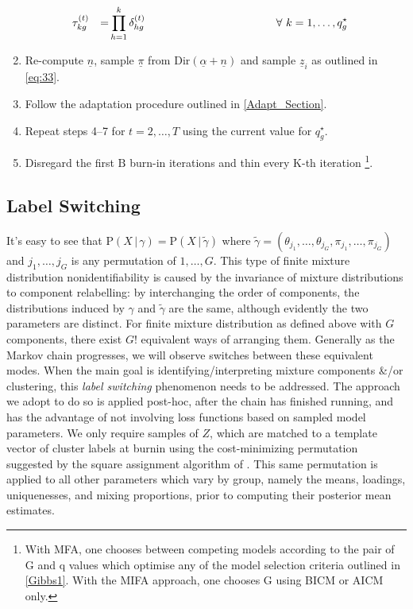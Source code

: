 \documentclass[a4paper,12pt,fleqn]{article}
\numberwithin{equation}{section}
\def\given{\,|\,}
\begin{document}
\begin{enumerate}[label*=\arabic*.]
\begin{alignat*}{4}
		&\tau_{kg}^{\left(t\right)} &=& \prod_{h=1}^{k}\delta_{hg}^{\left(t\right)}\quad\hspace{38mm}\forall~k=1,\ldots,q_g^\star\nonumber
		\end{alignat*}
	\item Re-compute $\underline{n}$, sample $\underline{\pi}$ from $\textrm{Dir}\left(\underline{\alpha} + \underline{n}\right)$ and sample $\underline{z}_i$ as outlined in \eqref{eq:33}.
	\item Follow the adaptation procedure outlined in \ref{Adapt_Section}.
	\item Repeat steps 4--7 for $t=2,\ldots,T$ using the current value for $q_g^\star$.
	\item Disregard the first $\textrm{B}$ burn-in iterations and thin every $\textrm{K}$-th iteration \footnote{With MFA, one chooses between competing models according to the pair of G and q values which optimise any of the model selection criteria outlined in \ref{Gibbs1}. With the MIFA approach, one chooses G using BICM or AICM only.}.
\end{enumerate}
\subsection[Label Switching]{Label Switching}
It's easy to see that $\mathrm{P}\left(X\given\gamma\right) = \mathrm{P}\left(X\given\tilde\gamma\right)$ where $\tilde\gamma = \left(\theta_{j_1},\ldots,\theta_{j_G},\pi_{j_1},\ldots,\pi_{j_G}\right)$ and $j_1,\ldots,j_G$ is any permutation of $1,\ldots,G$. This type of finite mixture distribution nonidentifiability is caused by the invariance of mixture distributions to component relabelling: by interchanging the order of components, the distributions induced by $\gamma$ and $\tilde{\gamma}$ are the same, although evidently the two parameters are distinct. For finite mixture distribution as defined above with $G$ components, there exist $G!$ equivalent ways of arranging them. Generally as the Markov chain progresses, we will observe switches between these equivalent modes. When the main goal is identifying/interpreting mixture components \&/or clustering, this \textit{label switching} phenomenon needs to be addressed. The approach we adopt to do so is applied post-hoc, after the chain has finished running, and has the advantage of not involving loss functions based on sampled model parameters. We only require samples of $Z$, which are matched to a template vector of cluster labels at burnin using the cost-minimizing permutation suggested by the square assignment algorithm of \cite{CarpToth1980}. This same permutation is applied to all other parameters which vary by group, namely the means, loadings, uniquenesses, and mixing proportions, prior to computing their posterior mean estimates.
\end{document}
